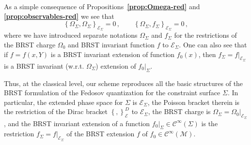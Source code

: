 \documentclass[a4paper,11pt]{amsart}
\numberwithin{thm}{section} %
\numberwithin{equation}{section} %
\numberwithin{figure}{section} %
\newcommand{\bref}[1]{{\bf \ref{#1}}}
\newcommand{\pb}[2]{\left\{{}#1{},{}#2{}\right\}}
\renewcommand{\:}{{\rm\, :\,}}
\newcommand{\func}[1]{{{\mathcal C}^\infty}{(#1)}}             %
\def\manM{{\mathcal M}}
\def\E{{ \mathcal E}}
\begin{document}
As a simple consequence of Propositions~\bref{prop:Omega-red}
and \bref{prop:observables-red} we see that
\begin{equation}
\pb{\Omega_\Sigma}{\Omega_\Sigma}_{\E_\Sigma}=0\,, \qquad 
\pb{\Omega_\Sigma}{f_\Sigma}_{\E_\Sigma}=0\,,
\end{equation}
where we have introduced separate notations $\Omega_\Sigma$ and
$f_\Sigma$ for the restrictions of the BRST charge $\Omega_0$ and BRST
invariant function $f$ to $\E_\Sigma$.  One can also see
that if $f=f(x,Y)$ is a BRST invariant extension of function $f_0(x)$,
then $f_\Sigma=f{\bigr|}_{\E_\Sigma}$ is a BRST invariant (w.r.t. $\Omega_\Sigma$)
extension of $f_0{\bigr|}_{\Sigma}$.

Thus, at the classical level, our scheme reproduces all the
basic structures of the BRST formulation of the Fedosov quantization
for the constraint surface $\Sigma$.  In particular, the extended phase space for
$\Sigma$ is $\E_\Sigma$, the Poisson bracket therein is the
restriction of the Dirac bracket $\pb{}{}^D_\E$ to $\E_\Sigma$, the
BRST charge is $\Omega_\Sigma=\Omega_0{\bigr|}_{\E_\Sigma}$, and the BRST
invariant extension of a function $f_0{\bigr|}_\Sigma\in \func\Sigma$ is the
restriction $f_\Sigma=f{\bigr|}_{\E_\Sigma}$ of the BRST extension $f$
of $f_0\in\func\manM$.
\end{document}
